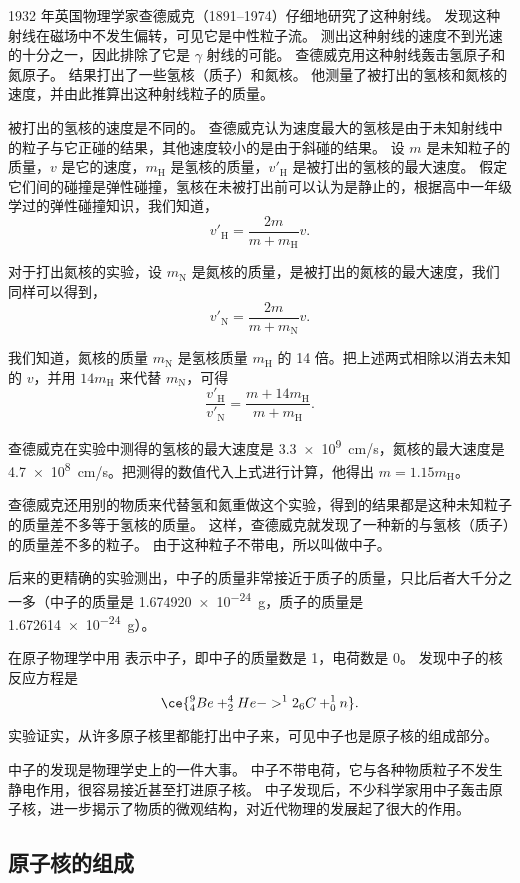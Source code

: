 1932 年英国物理学家查德威克（1891--1974）仔细地研究了这种射线。
发现这种射线在磁场中不发生偏转，可见它是中性粒子流。
测出这种射线的速度不到光速的十分之一，因此排除了它是 $\gamma$ 射线的可能。
查德威克用这种射线轰击氢原子和氮原子。
结果打出了一些氢核（质子）和氮核。
他测量了被打出的氢核和氮核的速度，并由此推算出这种射线粒子的质量。

被打出的氢核的速度是不同的。
查德威克认为速度最大的氢核是由于未知射线中的粒子与它正碰的结果，其他速度较小的是由于斜碰的结果。
设 $m$ 是未知粒子的质量，$v$ 是它的速度，$m_\text{H}$ 是氢核的质量，$v'_\text{H}$ 是被打出的氢核的最大速度。
假定它们间的碰撞是弹性碰撞，氢核在未被打出前可以认为是静止的，根据高中一年级学过的弹性碰撞知识，我们知道，
\[ v'_\text{H}=\frac{2m}{m+m_\text{H}}v.\]

对于打出氮核的实验，设 $m_\text{N}$ 是氮核的质量，是被打出的氮核的最大速度，我们同样可以得到，
\[ v'_\text{N}=\frac{2m}{m+m_\text{N}}v.\]

我们知道，氮核的质量 $m_\text{N}$ 是氢核质量 $m_\text{H}$ 的 14 倍。把上述两式相除以消去未知的 $v$，并用 $14m_\text{H}$ 来代替 $m_\text{N}$，可得
\[ \frac{v'_\text{H}}{v'_\text{N}} =\frac{m+14m_\text{H}}{m+m_\text{H}}.\]

查德威克在实验中测得的氢核的最大速度是 \qty{3.3e9}{cm/s}，氮核的最大速度是\qty{4.7e8}{cm/s}。把测得的数值代入上式进行计算，他得出 $m=1.15m_\text{H}$。

查德威克还用别的物质来代替氢和氮重做这个实验，得到的结果都是这种未知粒子的质量差不多等于氢核的质量。
这样，查德威克就发现了一种新的与氢核（质子）的质量差不多的粒子。
由于这种粒子不带电，所以叫做中子。

后来的更精确的实验测出，中子的质量非常接近于质子的质量，只比后者大千分之一多（中子的质量是 \qty{1.674920e-24}{g}，质子的质量是 \qty{1.672614e-24}{g}）。

在原子物理学中用  表示中子，即中子的质量数是 1，电荷数是 0。
发现中子的核反应方程是
\[ \ce{ ^9_4Be +^4_2He -> ^12_6C +^1_0n}.\]

实验证实，从许多原子核里都能打出中子来，可见中子也是原子核的组成部分。

中子的发现是物理学史上的一件大事。
中子不带电荷，它与各种物质粒子不发生静电作用，很容易接近甚至打进原子核。
中子发现后，不少科学家用中子轰击原子核，进一步揭示了物质的微观结构，对近代物理的发展起了很大的作用。

\subsection{原子核的组成}

